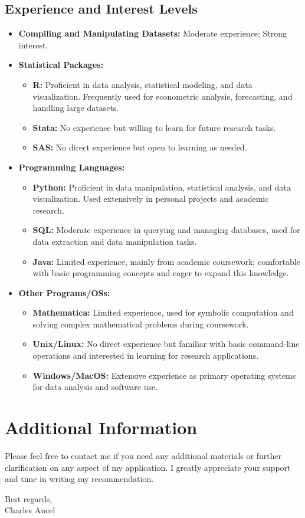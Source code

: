 \documentclass{article}
\begin{document}
\subsection*{Experience and Interest Levels}
\begin{itemize}
    \item \textbf{Compiling and Manipulating Datasets:} Moderate experience; Strong interest.
    \item \textbf{Statistical Packages:} 
        \begin{itemize}
            \item \textbf{R:} Proficient in data analysis, statistical modeling, and data visualization. Frequently used for econometric analysis, forecasting, and handling large datasets.
            \item \textbf{Stata:} No experience but willing to learn for future research tasks.
            \item \textbf{SAS:} No direct experience but open to learning as needed.
        \end{itemize}
    \item \textbf{Programming Languages:}
        \begin{itemize}
            \item \textbf{Python:} Proficient in data manipulation, statistical analysis, and data visualization. Used extensively in personal projects and academic research.
            \item \textbf{SQL:} Moderate experience in querying and managing databases, used for data extraction and data manipulation tasks.
            \item \textbf{Java:} Limited experience, mainly from academic coursework; comfortable with basic programming concepts and eager to expand this knowledge.
        \end{itemize}
    \item \textbf{Other Programs/OSs:}
        \begin{itemize}
            \item \textbf{Mathematica:} Limited experience, used for symbolic computation and solving complex mathematical problems during coursework.
            \item \textbf{Unix/Linux:} No direct experience but familiar with basic command-line operations and interested in learning for research applications.
            \item \textbf{Windows/MacOS:} Extensive experience as primary operating systems for data analysis and software use.
        \end{itemize}
\end{itemize}

\section*{Additional Information}
Please feel free to contact me if you need any additional materials or further clarification on any aspect of my application. I greatly appreciate your support and time in writing my recommendation.

\begin{flushleft}
Best regards,\\
Charles Ancel
\end{flushleft}
\end{document}
